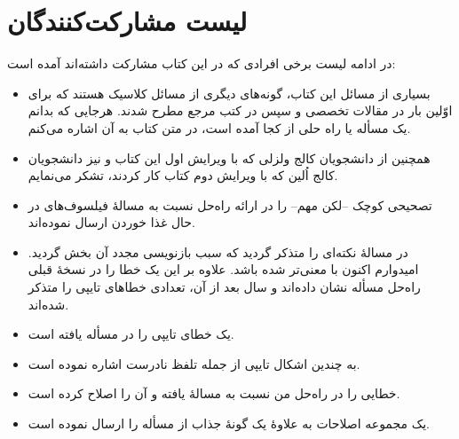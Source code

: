 \documentclass{book}
\begin{document}
\section*{لیست مشارکت‌کنندگان}

در ادامه لیست برخی افرادی که در این کتاب مشارکت داشته‌اند آمده است:

\begin{itemize}

\item    
    بسیاری از مسائل این کتاب، گونه‌های دیگری از مسائل کلاسیک هستند که برای اوّلین بار در مقالات تخصصی و سپس در کتب مرجع مطرح شدند. 
    هرجایی که بدانم یک مسأله یا راه حلی از کجا آمده است، در متن کتاب به آن اشاره می‌کنم.  

\item 
    همچنین از دانشجویان کالج ولزلی که با ویرایش اول این کتاب و نیز دانشجویان کالج اُلین
    که با ویرایش دوم کتاب  کار کردند، تشکر می‌نمایم. 

\item 
    تصحیحی کوچک --لکن مهم-- را در ارائه راه‌حل  نسبت به مسالهٔ فیلسوف‌های در حال غذا خوردن ارسال نموده‌اند.

\item {}
    در مسالهٔ  نکته‌ای را متذکر گردید که سبب بازنویسی مجدد آن بخش گردید. 
    امیدوارم اکنون با معنی‌تر شده باشد. 
    علاوه بر این  یک خطا را در نسخهٔ قبلی راه‌حل مسأله  نشان داده‌اند و سال بعد از آن، 
    تعدادی خطاهای تایپی را متذکر شده‌اند. 
    
\item {}
    یک خطای تایپی را در مسأله  یافته است. 

\item {}
    به چندین اشکال تایپی از جمله تلفظ نادرست  اشاره نموده است.

\item {}
    خطایی را در راه‌حل من نسبت به مسالهٔ  یافته و آن را اصلاح کرده است. 


\item {}
    یک مجموعه اصلاحات به علاوهٔ یک گونهٔ جذاب از مسأله  را ارسال نموده است. 
    
    


\end{itemize}
\end{document}
